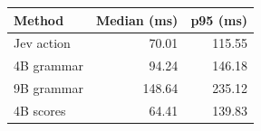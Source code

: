 \begin{tabular}{lrr}
\toprule
Method & Median (ms) & p95 (ms) \\
\midrule
Jev action & 70.01 & 115.55 \\
4B grammar & 94.24 & 146.18 \\
9B grammar & 148.64 & 235.12 \\
4B scores & 64.41 & 139.83 \\
\bottomrule
\end{tabular}
